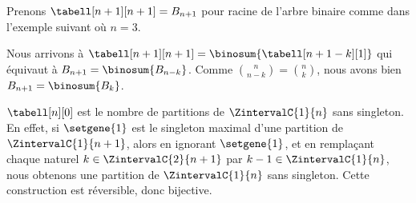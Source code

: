 \explaintree{\tabell}{\tabell[n][p-1]}{\tabell[n-1][p-1]}%
            {\bellintertree}{}

Prenons $\tabell[n+1][n+1] = B_{n+1}$ pour racine de l'arbre binaire comme dans l'exemple suivant où $n = 3$.


Nous arrivons à
$\tabell[n+1][n+1] = \binosum{\tabell[n+1-k][1]}$
qui équivaut à
$B_{n+1} = \binosum{B_{n-k}}$.
Comme $\binom{n}{n-k} = \binom{n}{k}$, nous avons bien 
$B_{n+1} = \binosum{B_k}$.


\begin{remark} \label{val-bell-n-0}
    $\tabell[n][0]$ est le nombre de partitions de $\ZintervalC{1}{n}$ sans singleton.
    En effet,
    si $\setgene{1}$ est le singleton maximal d'une partition de $\ZintervalC{1}{n+1}$,
    alors
    en ignorant $\setgene{1}$, 
    et
    en remplaçant chaque naturel $k \in \ZintervalC{2}{n+1}$ par $k-1 \in \ZintervalC{1}{n}$, nous obtenons une partition de $\ZintervalC{1}{n}$ sans singleton.
    Cette construction est réversible, donc bijective.
\end{remark}
